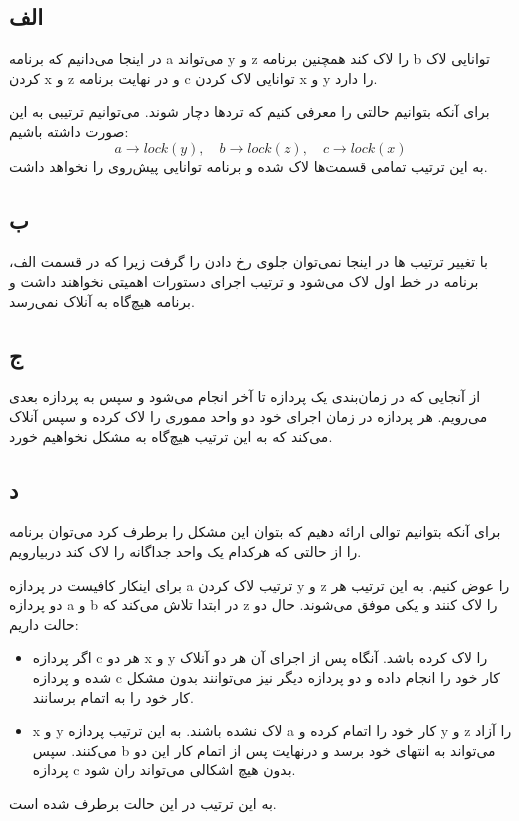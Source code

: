 \subsection*{الف}
در اینجا می‌دانیم که برنامه
a
می‌تواند
y
و
z
را لاک کند همچنین برنامه
b
توانایی لاک کردن
x
و
z
و در نهایت برنامه
c
توانایی لاک‌ کردن
x
و
y
را دارد.

برای آنکه بتوانیم حالتی را معرفی کنیم که تردها دچار
شوند. می‌توانیم ترتیبی به این صورت داشته باشیم:
\[
    a \to lock(y), \quad b \to lock(z), \quad c \to lock(x)
\]
به این ترتیب تمامی قسمت‌ها لاک شده و برنامه توانایی پیش‌روی را نخواهد داشت.

\subsection*{ب}
با تغییر ترتیب
ها در اینجا نمی‌توان جلوی رخ دادن
را گرفت زیرا که در قسمت الف، برنامه در خط اول لاک می‌شود و ترتیب اجرای دستورات
اهمیتی نخواهند داشت و برنامه هیچ‌گاه به آنلاک نمی‌رسد.

\subsection*{ج}
از آنجایی که در زمان‌بندی
یک پردازه تا آخر انجام می‌شود و سپس به پردازه بعدی می‌رویم. هر پردازه در زمان اجرای خود دو واحد مموری را لاک کرده و سپس آنلاک می‌کند که به این ترتیب هیچ‌گاه به مشکل
نخواهیم خورد.

\subsection*{د}
برای آنکه بتوانیم توالی ارائه دهیم که بتوان این مشکل را برطرف کرد می‌توان برنامه را از حالتی که هرکدام یک واحد جداگانه را لاک کند دربیارویم.

برای اینکار کافیست در پردازه
a
ترتیب لاک کردن
y
و
z 
را عوض کنیم. به این ترتیب هر دو پردازه
a
و
b
در ابتدا تلاش می‌کند که
z
را لاک کنند و یکی موفق می‌شوند. حال دو حالت داریم:
\begin{itemize}
    \item
    اگر پردازه
    c
    هر دو
    x
    و
    y
    را لاک کرده باشد. آنگاه پس از اجرای آن هر دو آنلاک شده و پردازه
    c
    کار خود را انجام داده و دو پردازه دیگر نیز می‌توانند بدون مشکل کار خود را به اتمام برسانند.
    
    \item
    x
    و
    y
    لاک نشده باشند. به این ترتیب پردازه
    a
    کار خود را اتمام کرده و 
    y
    و
    z
    را آزاد می‌کنند. سپس
    b
    می‌تواند به انتهای خود برسد و درنهایت پس از اتمام کار این دو پردازه
    c
    بدون هیچ اشکالی می‌تواند ران شود.
\end{itemize}
به این ترتیب
در این حالت برطرف شده است.



